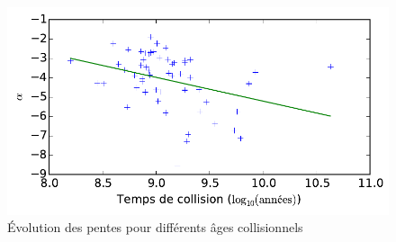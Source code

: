 
				\begin{figure}[h!]
					\centering \includegraphics[scale=1.0]{graphe/pente_tc.pdf}
					\caption{Évolution des pentes pour différents âges collisionnels}
					\label{Pente-lin_dim}
				\end{figure}

